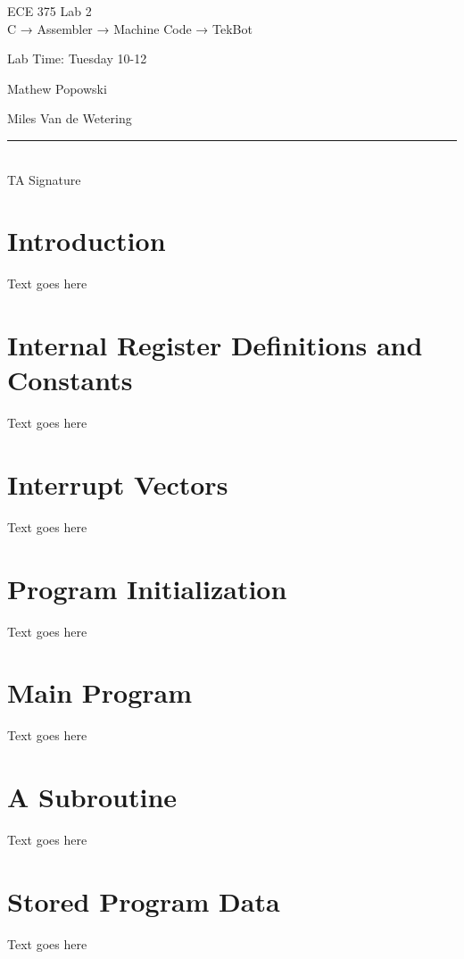 \documentclass[12pt,letterpaper]{article}
\begin{document}
\begin{titlepage}
    \vspace*{4cm}
    \begin{flushright}
    {\huge
        ECE 375 Lab 2\\[1cm]
    }
    {\large
        C → Assembler → Machine Code → TekBot
    }
    \end{flushright}
    \begin{flushleft}
    Lab Time: Tuesday 10-12
    \end{flushleft}
    \begin{flushright}
    Mathew Popowski

    Miles Van de Wetering
    \vfill
    \rule{5in}{.5mm}\\
    TA Signature
    \end{flushright}

\end{titlepage}

\section{Introduction}
Text goes here

\section{Internal Register Definitions and Constants}
Text goes here

\section{Interrupt Vectors}
Text goes here

\section{Program Initialization}
Text goes here

\section{Main Program}
Text goes here

\section{A Subroutine}
Text goes here

\section{Stored Program Data}
Text goes here
\end{document}
